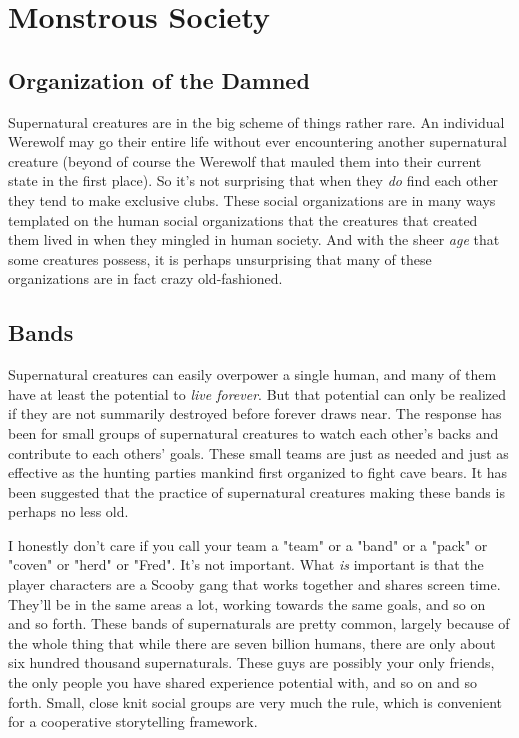 \chapter{Monstrous Society}

\section{Organization of the Damned}

Supernatural creatures are in the big scheme of things rather rare. An individual Werewolf may go their entire life without ever encountering another supernatural creature (beyond of course the Werewolf that mauled them into their current state in the first place). So it's not surprising that when they \textit{do} find each other they tend to make exclusive clubs. These social organizations are in many ways templated on the human social organizations that the creatures that created them lived in when they mingled in human society. And with the sheer \textit{age} that some creatures possess, it is perhaps unsurprising that many of these organizations are in fact crazy old-fashioned.

\section{Bands} 

Supernatural creatures can easily overpower a single human, and many of them have at least the potential to \textit{live forever}. But that potential can only be realized if they are not summarily destroyed before forever draws near. The response has been for small groups of supernatural creatures to watch each other's backs and contribute to each others' goals. These small teams are just as needed and just as effective as the hunting parties mankind first organized to fight cave bears. It has been suggested that the practice of supernatural creatures making these bands is perhaps no less old.

I honestly don't care if you call your team a "team" or a "band" or a "pack" or "coven" or "herd" or "Fred". It's not important. What \textit{is} important is that the player characters are a Scooby gang that works together and shares screen time. They'll be in the same areas a lot, working towards the same goals, and so on and so forth. These bands of supernaturals are pretty common, largely because of the whole thing that while there are seven billion humans, there are only about six hundred thousand supernaturals. These guys are possibly your only friends, the only people you have shared experience potential with, and so on and so forth. Small, close knit social groups are very much the rule, which is convenient for a cooperative storytelling framework.

